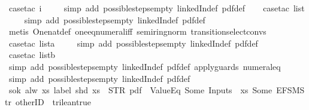 \begin{isabellebody}
\isamarkupfalse%
\ {\isacharparenleft}case{\isacharunderscore}tac\ i{\isacharparenright}\isanewline
\ \ \ \isamarkupfalse%
\ {\isacharparenleft}simp\ add{\isacharcolon}\ possible{\isacharunderscore}steps{\isacharunderscore}empty\ linkedIn{\isacharunderscore}def\ pdf{}{\isacharunderscore}def{\isacharparenright}\isanewline
\ \ \isamarkupfalse%
\ {\isacharparenleft}case{\isacharunderscore}tac\ list{\isacharparenright}\isanewline
\ \ \ \isamarkupfalse%
\ {\isacharparenleft}simp\ add{\isacharcolon}\ possible{\isacharunderscore}steps{\isacharunderscore}empty\ linkedIn{\isacharunderscore}def\ pdf{}{\isacharunderscore}def{\isacharparenright}\isanewline
\ \ \isamarkupfalse%
\ {\isacharparenleft}metis\ One{\isacharunderscore}nat{\isacharunderscore}def\ one{\isacharunderscore}eq{\isacharunderscore}numeral{\isacharunderscore}iff\ semiring{\isacharunderscore}norm{\isacharparenleft}{}{}{\isacharparenright}\ transition{\isachardot}select{\isacharunderscore}convs{\isacharparenleft}{}{\isacharparenright}{\isacharparenright}\isanewline
\ \ \isamarkupfalse%
\ {\isacharparenleft}case{\isacharunderscore}tac\ lista{\isacharparenright}\isanewline
\ \ \ \isamarkupfalse%
\ {\isacharparenleft}simp\ add{\isacharcolon}\ possible{\isacharunderscore}steps{\isacharunderscore}empty\ linkedIn{\isacharunderscore}def\ pdf{}{\isacharunderscore}def{\isacharparenright}\isanewline
\ \ \isamarkupfalse%
\ {\isacharparenleft}case{\isacharunderscore}tac\ listb{\isacharparenright}\isanewline
\ \ \isamarkupfalse%
\ {\isacharparenleft}simp\ add{\isacharcolon}\ possible{\isacharunderscore}steps{\isacharunderscore}empty\ linkedIn{\isacharunderscore}def\ pdf{}{\isacharunderscore}def\ apply{\isacharunderscore}guards\ numeral{\isacharunderscore}{}{\isacharunderscore}eq{\isacharunderscore}{}{\isacharparenright}\isanewline
\ \ \isamarkupfalse%
\ {\isacharparenleft}simp\ add{\isacharcolon}\ possible{\isacharunderscore}steps{\isacharunderscore}empty\ linkedIn{\isacharunderscore}def\ pdf{}{\isacharunderscore}def{\isacharparenright}%
\endisatagproof
{\isafoldproof}%
%
\isadelimproof
\isanewline
%
\endisadelimproof
\isanewline
{}\isamarkupfalse%
\ s{}{\isacharunderscore}ok{\isacharcolon}\ {\isachardoublequoteopen}alw\ {\isacharparenleft}{\isasymlambda}xs{\isachardot}\ label\ {\isacharparenleft}shd\ xs{\isacharparenright}\ {\isacharequal}\ STR\ {\isacharprime}{\isacharprime}pdf{\isacharprime}{\isacharprime}\ {\isasymand}\ ValueEq\ {\isacharparenleft}Some\ {\isacharparenleft}Inputs\ {}\ xs{\isacharparenright}{\isacharparenright}\ {\isacharparenleft}Some\ {\isacharparenleft}EFSM{\isachardot}Str\ {\isacharprime}{\isacharprime}otherID{\isacharprime}{\isacharprime}{\isacharparenright}{\isacharparenright}\ {\isacharequal}\ trilean{\isachardot}true\ {\isasymlongrightarrow}\isanewline

\end{isabellebody}
